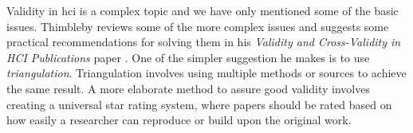 Validity in \gls{hci} is a complex topic and we have only mentioned some of the basic issues. Thimbleby reviews some of the more complex issues and suggests some practical recommendations for solving them in his \textit{Validity and Cross-Validity in HCI Publications} paper \cite{validation}. One of the simpler suggestion he makes is to use \emph{triangulation}. Triangulation involves using multiple methods or sources to achieve the same result. A more elaborate method to assure good validity involves creating a universal star rating system, where papers should be rated based on how easily a researcher can reproduce or build upon the original work.
